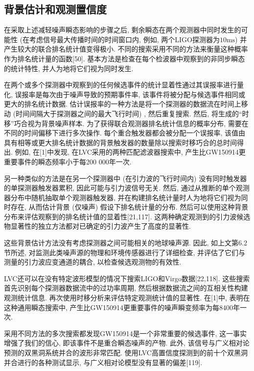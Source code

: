 \documentclass[a4paper]{\documentclassname}
\def\t{\text}
\theoremstyle{definition}
\begin{document}
\subsection{背景估计和观测置信度}

在采取上述减轻噪声瞬态影响的步骤之后, 剩余瞬态在两个观测器中同时发生的可能性 (在考虑信号最大传播时间的时间窗口内, 例如, 两个LIGO探测器为$10\t{ms}$) 并产生较大的联合排名统计值变得极小. 不同的搜索采用不同的方法来衡量这种概率作为排名统计量的函数[50]. 基本方法是检查在每个检波器中观察到的非同步瞬态的统计特性, 并人为地将它们视为同时发生. 

在两个或多个探测器中观察到的任何候选事件的统计显着性通过其误报率进行量化, 误报率是每次由于噪声导致的预期事件率, 该事件将被分配与候选事件相同或更大的排名统计数据. 估计误报率的一种方法是将一个探测器的数据流在时间上移动 (时间间隔大于探测器之间的最大飞行时间) , 然后重复搜索. 然后, 将生成的``时移''巧合视为背景噪声样本. 为了获得联合观测器排名统计信息的概率分布, 需要在不同的时间偏移下进行多次操作. 每个重合触发器都会被分配一个误报率, 该值由具有相等或更大排名统计数据的背景触发器的数量除以搜索时移巧合的总时间得出. 例如, 在[1]中发现, 在LVC采用的两种匹配滤波器搜索中, 产生比GW150914更重要事件的瞬态频率小于每200 000年一次. 

另一种类似的方法是在另一个探测器中 (在引力波的飞行时间内) 没有同时触发器的单探测器触发器累积, 因此可能与引力波信号无关. 然后, 通过从推断的单个观测器分布中随机抽取单个观测器触发器, 并在构建排名统计量时人为地将它们视为同时存在, 从而估计背景 (仅噪声) 假设下排名统计量的分布. 然后可以使用这种背景分布来评估观察到的排名统计值的显着性[21,117]. 这两种确定观测到的引力波候选物显著性的独立方法都对已确定的引力波产生了高度的显著性. 

这些背景估计方法没有考虑探测器之间可能相关的地球噪声源. 因此, 如上文第6.2节所述, 对监测此类噪声源的物理和环境传感器进行了详细检查, 并评估了它们与测量的引力波应变通道的耦合, 以检查候选观测物的有效性. 

LVC还可以在没有特定波形模型的情况下搜索LIGO和Virgo数据[22,118]. 这些搜索首先识别每个探测器数据流中的过功率周期, 然后根据数据流之间的互相关性构建观测统计信息. 再次使用时移分析来评估特定观测统计值的显著性. 在[1]中, 表明在这种通用瞬态搜索中, 产生比GW150914更重要事件的噪声瞬变频率为每8400年一次. 

采用不同方法的多次搜索都发现GW150914是一个非常重要的候选事件, 这一事实增强了我们的信心, 即该事件不是重合瞬态噪声的产物. 此外, 该信号与广义相对论预测的双黑洞系统并合的波形非常匹配. 使用LVC高置信度探测到的前十个双黑洞并合进行的各种测试显示, 与广义相对论模型没有显著的偏差[119]. 
\end{document}
